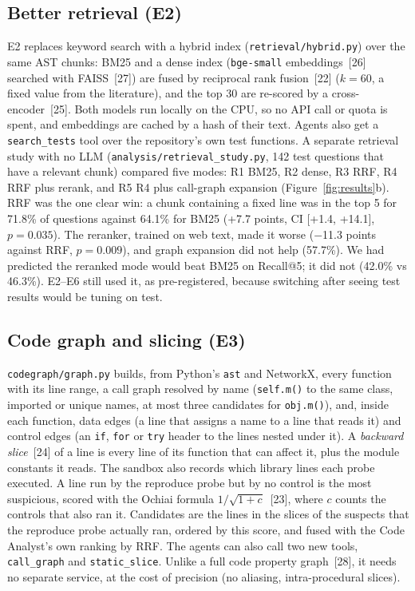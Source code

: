 \documentclass[10pt,a4paper]{article}
\newcommand{\code}[1]{\texttt{\small #1}}
\newcommand{\m}{$-$}
\begin{document}
\subsection{Better retrieval (E2)}

E2 replaces keyword search with a hybrid index (\code{retrieval/hybrid.py}) over the same AST chunks: BM25 and a dense
index (\code{bge-small} embeddings~[26] searched with FAISS~[27]) are fused by reciprocal rank fusion~[22] ($k=60$, a
fixed value from the literature), and the top 30 are re-scored by a cross-encoder~[25]. Both models run locally on the
CPU, so no API call or quota is spent, and embeddings are cached by a hash of their text. Agents also get a
\code{search\_tests} tool over the repository's own test functions. A separate retrieval study with no LLM
(\code{analysis/retrieval\_study.py}, 142 test questions that have a relevant chunk) compared five modes: R1 BM25, R2
dense, R3 RRF, R4 RRF plus rerank, and R5 R4 plus call-graph expansion (Figure~\ref{fig:results}b). RRF was the one
clear win: a chunk containing a fixed line was in the top 5 for 71.8\% of questions against 64.1\% for BM25 (+7.7
points, CI [+1.4, +14.1], $p=0.035$). The reranker, trained on web text, made it worse (\m11.3 points against RRF,
$p=0.009$), and graph expansion did not help (57.7\%). We had predicted the reranked mode would beat BM25 on Recall@5;
it did not (42.0\% vs 46.3\%). E2--E6 still used it, as pre-registered, because switching after seeing test results
would be tuning on test.

\subsection{Code graph and slicing (E3)}

\code{codegraph/graph.py} builds, from Python's \code{ast} and NetworkX, every function with its line range, a call
graph resolved by name (\code{self.m()} to the same class, imported or unique names, at most three candidates for
\code{obj.m()}), and, inside each function, data edges (a line that assigns a name to a line that reads it) and control
edges (an \code{if}, \code{for} or \code{try} header to the lines nested under it). A \emph{backward slice}~[24] of a
line is every line of its function that can affect it, plus the module constants it reads. The sandbox also records
which library lines each probe executed. A line run by the reproduce probe but by no control is the most suspicious,
scored with the Ochiai formula $1/\sqrt{1+c}$~[23], where $c$ counts the controls that also ran it. Candidates are the
lines in the slices of the suspects that the reproduce probe actually ran, ordered by this score, and fused with the
Code Analyst's own ranking by RRF. The agents can also call two new tools, \code{call\_graph} and \code{static\_slice}.
Unlike a full code property graph~[28], it needs no separate service, at the cost of precision (no aliasing,
intra-procedural slices).
\end{document}
